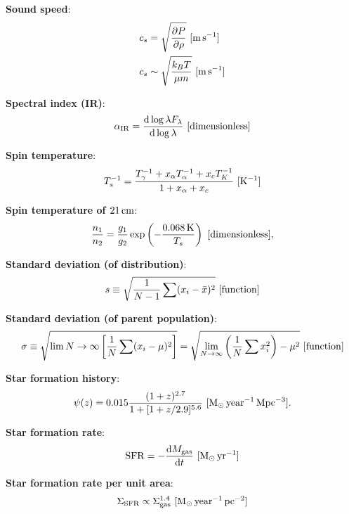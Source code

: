 \documentclass[a4paper,10pt]{article}
\begin{document}
{\noindent}\textbf{Sound speed}:
\begin{align*}
    c_s &= \sqrt{\frac{\partial P}{\partial\rho}} ~ [{\rm m\,s^{-1}}] \\
    c_s &\sim \sqrt{\frac{k_BT}{\mu m}} ~ [{\rm m\,s^{-1}}]
\end{align*}

{\noindent}\textbf{Spectral index (IR)}:
\begin{align*}
    \alpha_{\rm IR} = \frac{{\rm d}\log\lambda F_\lambda}{{\rm d}\log \lambda} ~ [{\rm dimensionless}]
\end{align*}

{\noindent}\textbf{Spin temperature}:
\begin{align*}
    T_s^{-1} = \frac{T_\gamma^{-1} + x_\alpha T_\alpha^{-1} + x_cT_K^{-1}}{1+x_\alpha+x_c} ~ [{\rm K^{-1}}]
\end{align*}

{\noindent}\textbf{Spin temperature of $21\,{\rm cm}$}:
\begin{align*}
    \frac{n_1}{n_2} = \frac{g_1}{g_2}\exp\left(-\frac{0.068\,{\rm K}}{T_s}\right) ~ [{\rm dimensionless}],
\end{align*}

{\noindent}\textbf{Standard deviation (of distribution)}:
\begin{align*}
    s \equiv \sqrt{\frac{1}{N-1} \sum (x_i-\bar{x})^2} ~ [{\rm function}]
\end{align*}

{\noindent}\textbf{Standard deviation (of parent population)}:
\begin{align*}
    \sigma \equiv \sqrt{\lim{N\rightarrow\infty} \left[\frac{1}{N}\sum(x_i-\mu)^2\right]} = \sqrt{\lim_{N\rightarrow\infty} \left(\frac{1}{N}\sum x_i^2\right)-\mu^2} ~ [{\rm function}]
\end{align*}

{\noindent}\textbf{Star formation history}:
\begin{align*}
    \psi(z) = 0.015\frac{(1+z)^{2.7}}{1+[1+z/2.9]^{5.6}} ~ [{\rm M_\odot\,year^{-1}\,Mpc^{-3}}].
\end{align*}

{\noindent}\textbf{Star formation rate}:
\begin{align*}
    \mathrm{SFR} = -\frac{\mathrm{d}M_\mathrm{gas}}{\mathrm{d}t} ~ [{\rm M_\odot\,yr^{-1}}]
\end{align*}

{\noindent}\textbf{Star formation rate per unit area}:
\begin{align*}
    \Sigma_\mathrm{SFR} \propto \Sigma_\mathrm{gas}^{1.4} ~ [{\rm M_\odot\,year^{-1}\,pc^{-2}}]
\end{align*}
\end{document}
